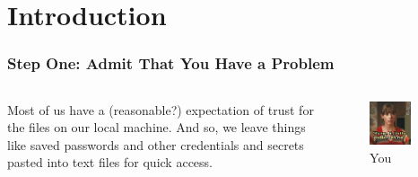 \documentclass[aspectratio=169]{beamer}
\begin{document}
\section{Introduction}

{
\begin{frame}
    \frametitle{Step One: Admit That You Have a Problem}

    \begin{columns}

        Most of us have a (reasonable?) expectation of trust for the files on our local machine. And so, we leave things like saved passwords and other credentials and secrets pasted into text files for quick access.

        \begin{figure}
            \centering
            \includegraphics[width=0.77\textwidth]{../static/images/problem.jpg}
            \caption{You}
            \label{fig:question}
        \end{figure}

    \end{columns}


\end{frame}
}
\end{document}
